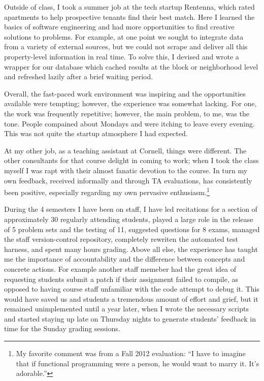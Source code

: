 \documentclass{article}
\begin{document}
Outside of class, I took a summer job at the tech startup Rentenna, which rated apartments to help prospective tenants find their best match.
Here I learned the basics of software engineering and had more opportunities to find creative solutions to problems.
For example, at one point we sought to integrate data from a variety of external sources, but we could not scrape and deliver all this property-level information in real time.
To solve this, I devised and wrote a wrapper for our database which cached results at the block or neighborhood level and refreshed lazily after a brief waiting period.

Overall, the fast-paced work environment was inspiring and the opportunities available were tempting; however, the experience was somewhat lacking.
For one, the work was frequently repetitive; however, the main problem, to me, was the tone. 
People compained about Mondays and were itching to leave every evening. 
This was not quite the startup atmosphere I had expected.

At my other job, as a teaching assistant at Cornell, things were different.
The other consultants for that course delight in coming to work; when I took the class myself I was rapt with their almost fanatic devotion to the course. 
In turn my own feedback, received informally and through TA evaluations, has consistently been positive, especially regarding my own pervasive enthusiasm.\footnote{My favorite comment was from a Fall 2012 evaluation: ``I have to imagine that if functional programming were a person, he would want to marry it. It's adorable.''}

During the 4 semesters I have been on staff, I have led recitations for a section of approximately 30 regularly attending students, played a large role in the release of 5 problem sets and the testing of 11, suggested questions for 8 exams, managed the staff version-control repository, completely rewriten the automated test harness, and spent many hours grading.
Above all else, the experience has taught me the importance of accountability and the difference between concepts and concrete actions.
For example another staff memeber had the great idea of requesting students submit a patch if their assignment failed to compile, as opposed to having course staff unfamiliar with the code attempt to debug it.
This would have saved us and students a tremendous amount of effort and grief, but it remained unimplemented until a year later, when I wrote the necessary scripts and started staying up late on Thursday nights to generate students' feedback in time for the Sunday grading sessions.
\end{document}
